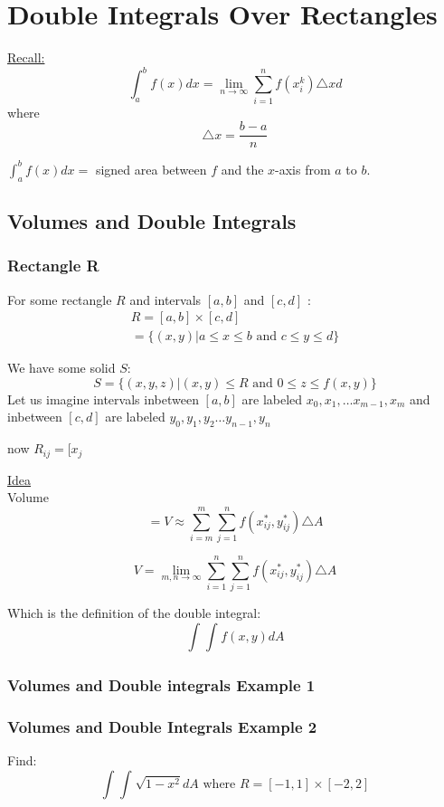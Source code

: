 \documentclass[12pt]{article}
\begin{document}
\section{Double Integrals Over Rectangles}
\underline{Recall:} 
\[\int_{a}^{b} f(x)dx = \lim_{n \to \infty} \sum_{i=1}^{n} f(x_i^k)\triangle xd\] 
where 
\[\triangle x = \frac{b-a}{n}\]

\(\int_{a}^{b} f(x)dx = \) signed area between \(f\) and the \(x\)-axis from \(a\) to \(b\).

\subsection{Volumes and Double Integrals}
\subsubsection{Rectangle R}
For some rectangle \(R\) and intervals \([a,b]\) and \([c,d]\) :
\begin{align*}
	\label{eq:Volume on interval}
	R = [a,b] \times  [c,d]\\
	 = \{(x,y)|a \leq x \leq b \text{ and } c \leq y \leq d\}
\end{align*}

We have some solid \(S\):
\[
	S = \{(x,y,z)|(x,y) \leq R \text{ and } 0 \leq z \leq f(x,y)\}
\]
Let us imagine intervals inbetween \([a,b]\) are labeled \(x_0,x_1, \hdots x_{m-1}, x_m\) and inbetween \([c,d]\) are labeled \(y_0, y_1, y_2 \hdots y_{n-1}, y_n\)

now \(R_{ij} = [x_j \) %

\underline{Idea}\\
Volume \[ = V \approx \sum_{i=m}^{m} \sum_{j=1}^{n} f(x_{ij} ^ *, y_{ij}^*) \triangle A\]

\[
	V = \lim_{m,n \to \infty} \sum_{i=1}^{n} \sum_{j=1}^{n} f(x_{ij}^*, y_{ij}^*) \triangle A
\]

Which is the definition of the double integral: 
\[\int_{}^{} \int_{}^{} f(x,y)dA\]

\subsubsection{Volumes and Double integrals Example 1}

\subsubsection{Volumes and Double Integrals Example 2}
Find: \[
	\int_{}^{} \int_{}^{} \sqrt{1-x^2} dA \text{ where } R = [-1,1] \times [-2,2]
\]
\end{document}
